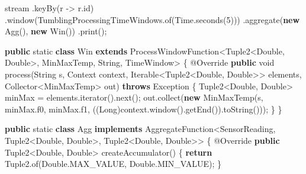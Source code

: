 \documentclass[cn,11pt,chinese]{elegantbook}
\newenvironment{Shaded}{}{}
\newcommand{\AttributeTok}[1]{\textcolor[rgb]{0.49,0.56,0.16}{#1}}
\newcommand{\BuiltInTok}[1]{#1}
\newcommand{\DataTypeTok}[1]{\textcolor[rgb]{0.56,0.13,0.00}{#1}}
\newcommand{\DecValTok}[1]{\textcolor[rgb]{0.25,0.63,0.44}{#1}}
\newcommand{\FunctionTok}[1]{\textcolor[rgb]{0.02,0.16,0.49}{#1}}
\newcommand{\KeywordTok}[1]{\textcolor[rgb]{0.00,0.44,0.13}{\textbf{#1}}}
\newcommand{\NormalTok}[1]{#1}
\begin{document}
\begin{Shaded}
\begin{Highlighting}[]
\NormalTok{stream}
\NormalTok{    .}\FunctionTok{keyBy}\NormalTok{(r {-}\textgreater{} r.}\FunctionTok{id}\NormalTok{)}
\NormalTok{    .}\FunctionTok{window}\NormalTok{(TumblingProcessingTimeWindows.}\FunctionTok{of}\NormalTok{(}\BuiltInTok{Time}\NormalTok{.}\FunctionTok{seconds}\NormalTok{(}\DecValTok{5}\NormalTok{)))}
\NormalTok{    .}\FunctionTok{aggregate}\NormalTok{(}\KeywordTok{new} \FunctionTok{Agg}\NormalTok{(), }\KeywordTok{new} \FunctionTok{Win}\NormalTok{())}
\NormalTok{    .}\FunctionTok{print}\NormalTok{();}

\KeywordTok{public} \DataTypeTok{static} \KeywordTok{class}\NormalTok{ Win }\KeywordTok{extends}\NormalTok{ ProcessWindowFunction\textless{}Tuple2\textless{}}\BuiltInTok{Double}\NormalTok{, }\BuiltInTok{Double}\NormalTok{\textgreater{}, MinMaxTemp, }\BuiltInTok{String}\NormalTok{, TimeWindow\textgreater{} \{}
    \AttributeTok{@Override}
    \KeywordTok{public} \DataTypeTok{void} \FunctionTok{process}\NormalTok{(}\BuiltInTok{String}\NormalTok{ s, }\BuiltInTok{Context}\NormalTok{ context, }\BuiltInTok{Iterable}\NormalTok{\textless{}Tuple2\textless{}}\BuiltInTok{Double}\NormalTok{, }\BuiltInTok{Double}\NormalTok{\textgreater{}\textgreater{} elements, Collector\textless{}MinMaxTemp\textgreater{} out) }\KeywordTok{throws} \BuiltInTok{Exception}\NormalTok{ \{}
\NormalTok{        Tuple2\textless{}}\BuiltInTok{Double}\NormalTok{, }\BuiltInTok{Double}\NormalTok{\textgreater{} minMax = elements.}\FunctionTok{iterator}\NormalTok{().}\FunctionTok{next}\NormalTok{();}
\NormalTok{        out.}\FunctionTok{collect}\NormalTok{(}\KeywordTok{new} \FunctionTok{MinMaxTemp}\NormalTok{(s, minMax.}\FunctionTok{f0}\NormalTok{, minMax.}\FunctionTok{f1}\NormalTok{, ((}\BuiltInTok{Long}\NormalTok{)context.}\FunctionTok{window}\NormalTok{().}\FunctionTok{getEnd}\NormalTok{()).}\FunctionTok{toString}\NormalTok{()));}
\NormalTok{    \}}
\NormalTok{\}}

\KeywordTok{public} \DataTypeTok{static} \KeywordTok{class}\NormalTok{ Agg }\KeywordTok{implements}\NormalTok{ AggregateFunction\textless{}SensorReading, Tuple2\textless{}}\BuiltInTok{Double}\NormalTok{, }\BuiltInTok{Double}\NormalTok{\textgreater{}, Tuple2\textless{}}\BuiltInTok{Double}\NormalTok{, }\BuiltInTok{Double}\NormalTok{\textgreater{}\textgreater{} \{}
    \AttributeTok{@Override}
    \KeywordTok{public}\NormalTok{ Tuple2\textless{}}\BuiltInTok{Double}\NormalTok{, }\BuiltInTok{Double}\NormalTok{\textgreater{} }\FunctionTok{createAccumulator}\NormalTok{() \{}
        \KeywordTok{return}\NormalTok{ Tuple2.}\FunctionTok{of}\NormalTok{(}\BuiltInTok{Double}\NormalTok{.}\FunctionTok{MAX\_VALUE}\NormalTok{, }\BuiltInTok{Double}\NormalTok{.}\FunctionTok{MIN\_VALUE}\NormalTok{);}
\NormalTok{    \}}


\end{Highlighting}
\end{Shaded}
\end{document}
